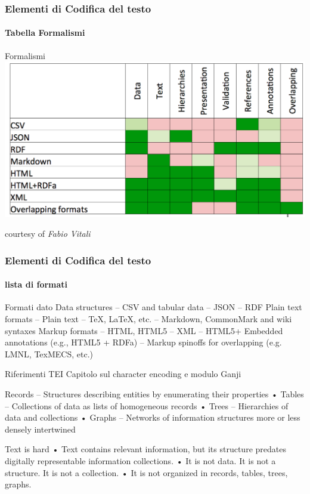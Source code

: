 
\begin{frame}
    \frametitle{Elementi di Codifica del testo}
    \framesubtitle{Tabella Formalismi}
    \addtocounter{nframe}{1}
    
    \begin{block}{Formalismi}
	    \includegraphics[width=.5\textwidth]{imgs/TabellaFormalismiCodificaTesto.png}
    \end{block}
    courtesy of \textit{Fabio Vitali}

\end{frame}


\begin{frame}
    \frametitle{Elementi di Codifica del testo}
    \framesubtitle{lista di formati}
    \addtocounter{nframe}{1}
    
    \begin{block}{Formati dato}
Data structures – CSV and tabular data
– JSON
– RDF
Plain text formats – Plain text
– TeX, LaTeX, etc.
– Markdown, CommonMark and wiki syntaxes
Markup formats
– HTML, HTML5
– XML
– HTML5+ Embedded annotations (e.g., HTML5 + RDFa)
– Markup spinoffs for overlapping (e.g. LMNL, TexMECS, etc.) 

    \end{block}

    \begin{block}{Riferimenti TEI}
        Capitolo sul character encoding e modulo Ganji 
    \end{block}

\end{frame}


Records
– Structures describing entities by enumerating their
properties
• Tables
– Collections of data as lists of homogeneous
records
• Trees
– Hierarchies of data and collections
• Graphs
– Networks of information structures more or less
densely intertwined 




Text is hard
• Text contains relevant information, but its
structure predates digitally representable
information collections.
• It is not data. It is not a structure. It is not a
collection.
• It is not organized in records, tables, trees,
graphs. 

